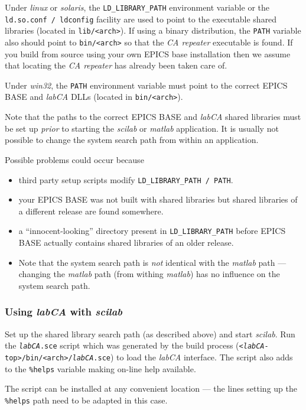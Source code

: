 \documentclass{article}
\newcommand{\sca}{\ita{labCA}}
\newcommand{\scilab}{\ita{scilab}}
\newcommand{\matlab}{\ita{matlab}}
\newcommand{\windoze}{\ita{win32}}
\newcommand{\com}[1]{{\tt #1}}
\newcommand{\ita}[1]{\emph{#1}}
\begin{document}
Under \ita{linux} or \ita{solaris}, the \com{LD\_LIBRARY\_PATH} environment
variable or the \com{ld.so.conf / ldconfig} facility are used to point
to the executable shared libraries (located in \com{lib/<arch>}).
If using a binary distribution, the \com{PATH} variable also should point
to \com{bin/<arch>} so that the \ita{CA repeater} executable is found.
If you build from source using your own EPICS base installation then
we assume that locating the \ita{CA repeater} has already been taken
care of.

Under \windoze{}, the \com{PATH} environment variable must point to the
correct EPICS BASE and \sca{} DLLs (located in \com{bin/<arch>}).

Note that the paths to the correct EPICS BASE and \sca{} shared libraries
must be set up \ita{prior} to starting the \scilab{} or \matlab{} application.
It is usually not possible to change the system search
path from within an application.

Possible problems could occur because
\begin{itemize}
\item third party setup scripts modify \com{LD\_LIBRARY\_PATH / PATH}.
\item your EPICS BASE was not built with shared libraries but shared libraries
of a different release are found somewhere.
\item a ``innocent-looking'' directory present in \com{LD\_LIBRARY\_PATH}
before EPICS BASE actually contains shared libraries of an older release.
\item Note that the system search path is \ita{not} identical with the
\matlab{} path --- changing the \matlab{} path (from withing \matlab)
has no influence on the system search path.
\end{itemize}

\subsubsection{Using \sca{} with \scilab}
Set up the shared library search path (as described above) and start
\scilab. Run the \com{\sca.sce} script which was generated by the build process
(\com{<\sca-top>/bin/<arch>/\sca.sce}) to load the \sca{} interface.
The script also adds to the \com{\%helps} variable making on-line
help available.

The script can be installed at any convenient location --- the lines
setting up the \com{\%helps} path need to be adapted in this case.
\end{document}
